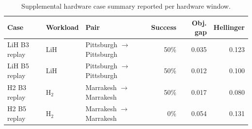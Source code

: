 \begin{table}[t]
\centering
{}
\begin{tabular}{lllrrr}
\toprule
Case & Workload & Pair & Success & Obj. gap & Hellinger \\
\midrule
LiH B3 replay & LiH & Pittsburgh $\rightarrow$ Pittsburgh & 50\% & 0.035 & 0.123 \\
LiH B5 replay & LiH & Pittsburgh $\rightarrow$ Pittsburgh & 50\% & 0.012 & 0.100 \\
H2 B3 replay & H$_2$ & Marrakesh $\rightarrow$ Marrakesh & 50\% & 0.017 & 0.080 \\
H2 B5 replay & H$_2$ & Marrakesh $\rightarrow$ Marrakesh & 0\% & 0.054 & 0.131 \\
\bottomrule
\end{tabular}
\caption{Supplemental hardware case summary reported per hardware window.}
\label{tab:supplemental\_hw\_case\_summary}
\end{table}
